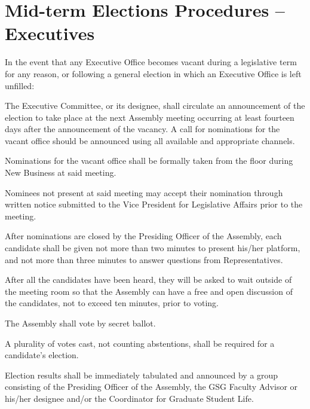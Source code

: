 \section{Mid-term Elections Procedures – Executives}
In the event that any Executive Office becomes vacant during a legislative term for any reason, or following a general election in which an Executive Office is left unfilled:
\begin{bylaws-number}
  \item The Executive Committee, or its designee, shall circulate an announcement of the election to take place at the next Assembly meeting occurring at least fourteen days after the announcement of the vacancy. A call for nominations for the vacant office should be announced using all available and appropriate channels.
  \item Nominations for the vacant office shall be formally taken from the floor during New Business at said meeting.
  \item Nominees not present at said meeting may accept their nomination through written notice submitted to the Vice President for Legislative Affairs prior to the meeting.
  \item After nominations are closed by the Presiding Officer of the Assembly, each candidate shall be given not more than two minutes to present his/her platform, and not more than three minutes to answer questions from Representatives.
  \item After all the candidates have been heard, they will be asked to wait outside of the meeting room so that the Assembly can have a free and open discussion of the candidates, not to exceed ten minutes, prior to voting.
  \item The Assembly shall vote by secret ballot.
  \item A plurality of votes cast, not counting abstentions, shall be required for a candidate’s election.
  \item Election results shall be immediately tabulated and announced by a group consisting of the Presiding Officer of the Assembly, the GSG Faculty Advisor or his/her designee and/or the Coordinator for Graduate Student Life.
\end{bylaws-number}

